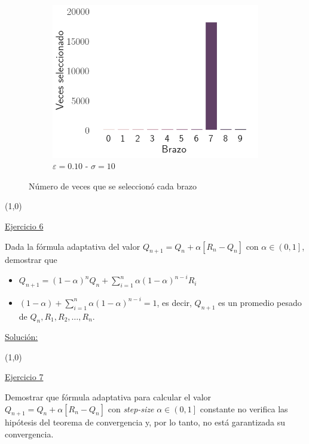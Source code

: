 \documentclass[12pt]{article}
\newlength\tindent
\renewcommand{\indent}{\hspace*{\tindent}}
\begin{document}
\begin{figure}[h]
\begin{subfigure}[H]{0.3\textwidth}
            \includegraphics[width=\textwidth]{../img/arm_sigma_10_epsilon_0.1}
            \caption{$\varepsilon=0.10$ - $\sigma=10$}
            \label{fig:arms_selected_10_0.1}
        \end{subfigure}

        \caption{Número de veces que se seleccionó cada brazo}
        \label{fig:arms_selected}
    \end{figure}

    \lipsum[2]

    \line(1,0){\textwidth}

    \indent\underline{Ejercicio 6}

    Dada la fórmula adaptativa del valor $Q_{n+1}= Q_n+\alpha\left[R_{n}-Q_{n}\right]$ con $\alpha\in\left(0,1\right]$, demostrar que

    \begin{itemize}
        \item $Q_{n+1}=(1-\alpha)^{n}Q_{n} + \sum_{i=1}^n \alpha(1-\alpha)^{n-i}R_{i}$
        \item $(1-\alpha)+\sum_{i=1}^{n} \alpha(1-\alpha)^{n-i}=1$, es decir, $Q_{n+1}$ es un promedio pesado de $Q_{n},R_1,R_2,\dots,R_n$.
    \end{itemize}

    \indent\underline{Solución:}

    \lipsum[2]

    \line(1,0){\textwidth}

    \indent\underline{Ejercicio 7}

    Demostrar que fórmula adaptativa para calcular el valor $Q_{n+1}=Q_n+\alpha\left[R_n-Q_n\right]$ con  \textit{step-size} $\alpha\in\left(0,1\right]$ constante no verifica las hipótesis del teorema de convergencia y, por lo tanto, no está garantizada su convergencia.
\end{document}
